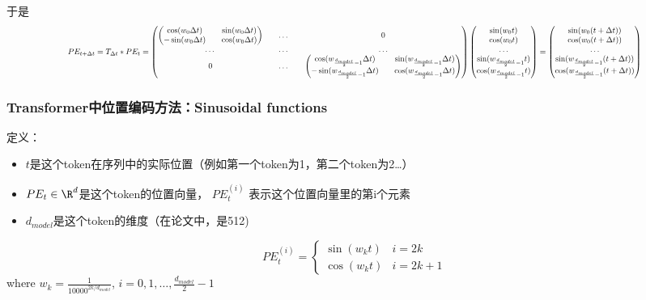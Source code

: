 \documentclass[11pt]{article}
\begin{document}
于是
\begin{equation*}
\scalebox{0.7}{$
PE_{t+\Delta t}=T_{\Delta t}*PE_t=
\begin{pmatrix}
\begin{pmatrix}
\cos(w_0\Delta t)&&\sin(w_0\Delta t)\\
-\sin(w_0\Delta t)&&\cos(w_0\Delta t)
\end{pmatrix}&&\dots&&0\\
\dots&&\dots&&\dots\\
0&&\dots&&
\begin{pmatrix}
\cos(w_{\frac{d_{model}}{2}-1}\Delta t)&&\sin(w_{\frac{d_{model}}{2}-1}\Delta t)\\
-\sin(w_{\frac{d_{model}}{2}-1}\Delta t)&&\cos(w_{\frac{d_{model}}{2}-1}\Delta t)
\end{pmatrix}
\end{pmatrix}
\begin{pmatrix}
\sin(w_0t)\\
\cos(w_0t)\\
\dots\\
\sin(w_{\frac{d_{model}}{2}-1}t)\\
\cos(w_{\frac{d_{model}}{2}-1}t)
\end{pmatrix}=
\begin{pmatrix}
\sin(w_0(t+\Delta t))\\
\cos(w_0(t+\Delta t))\\
\dots\\
\sin(w_{\frac{d_{model}}{2}-1}(t+\Delta t))\\
\cos(w_{\frac{d_{model}}{2}-1}(t+\Delta t))
\end{pmatrix}$}
\end{equation*}
\subsubsection{Transformer中位置编码方法：Sinusoidal functions}
\label{sec:org5cad8ad}
定义：
\begin{itemize}
\item \(t\)是这个token在序列中的实际位置（例如第一个token为1，第二个token为2\ldots{}）
\item \(PE_t\in\R^d\)是这个token的位置向量， \(PE_t^{(i)}\) 表示这个位置向量里的第i个元素
\item \(d_{model}\)是这个token的维度（在论文中，是512)
\end{itemize}

\begin{equation*}
PE_t^{(i)}=
\begin{cases}
\sin(w_kt)&i=2k\\
\cos(w_kt)&i=2k+1
\end{cases}
\end{equation*}
where \(w_k=\frac{1}{10000^{2k/d_{model}}}\),
\(i=0,1,\dots,\frac{d_{model}}{2}-1\)
\end{document}
